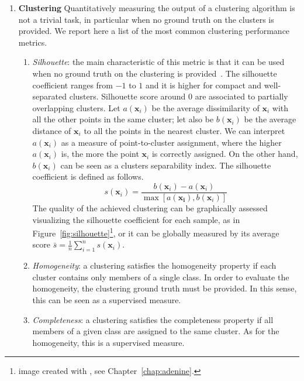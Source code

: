 \begin{enumerate}
        \item[] \textbf{Clustering} Quantitatively measuring the output of a clustering algorithm is not a trivial task, in particular when no ground truth on the clusters is provided. We report here a list of the most common clustering performance metrics.
        \begin{enumerate}[label=(\roman*)]
        	\item \textit{Silhouette}: the main characteristic of this metric is that it can be used when no ground truth on the clustering is provided~\cite{rousseeuw1987silhouettes}.
        	The silhouette coefficient ranges from $-1$ to $1$ and it is higher for compact and well-separated clusters. Silhouette score around $0$ are associated to partially overlapping clusters.
        	Let $a(\bm{x}_i)$ be the average dissimilarity of $\bm{x}_i$ with all the other points in the same cluster; let also be $b(\bm{x}_i)$ be the average distance of $\bm{x}_i$ to all the points in the nearest cluster. We can interpret $a(\bm{x}_i)$ as a measure of point-to-cluster assignment, where the higher $a(\bm{x}_i)$ is, the more the point $\bm{x}_i$ is correctly assigned. On the other hand, $b(\bm{x}_i)$ can be seen as a clusters separability index.
        	The silhouette coefficient is defined as follows.
        	\begin{equation} \label{eq:metrics_silhouette}
        	s(\bm{x}_i) = \frac{b(\bm{x}_i) - a(\bm{x}_i)}{\max[a(\bm{x_i}), b(\bm{x}_i)]}
        	\end{equation}
        	The quality of the achieved clustering can be graphically assessed visualizing the silhouette coefficient for each sample, as in Figure~\ref{fig:silhouette}\footnote{image created with \ade, see Chapter~\ref{chap:adenine}.}, or it can be globally measured by its average score $\bar s = \frac{1}{n}\sum_{i=1}^n s(\bm{x}_i)$.
        	
        	\item \textit{Homogeneity}: a clustering satisfies the homogeneity property if each cluster contains only members of a single class.
        	In order to evaluate the homogeneity, the clustering ground truth must be provided. In this sense, this can be seen as a supervised measure.
        	
        	\item \textit{Completeness}: a clustering satisfies the completeness property if all members of a given class are assigned to the same cluster.
        	As for the homogeneity, this is a supervised measure.
        	

\end{enumerate}
\end{enumerate}
